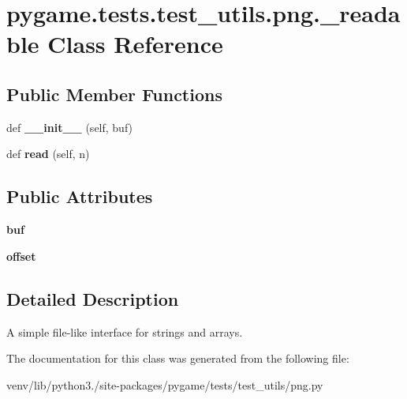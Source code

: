 \hypertarget{classpygame_1_1tests_1_1test__utils_1_1png_1_1__readable}{}\section{pygame.\+tests.\+test\+\_\+utils.\+png.\+\_\+readable Class Reference}
\label{classpygame_1_1tests_1_1test__utils_1_1png_1_1__readable}
\subsection*{Public Member Functions}
\begin{DoxyCompactItemize}
\item 
\mbox{\label{classpygame_1_1tests_1_1test__utils_1_1png_1_1__readable_a0be6bbcfc1be5d68fed54e150896993d}} 
def {\bfseries \+\_\+\+\_\+init\+\_\+\+\_\+} (self, buf)
\item 
\mbox{\label{classpygame_1_1tests_1_1test__utils_1_1png_1_1__readable_a27e49207af4d2a7040291765ced00a0b}} 
def {\bfseries read} (self, n)
\end{DoxyCompactItemize}
\subsection*{Public Attributes}
\begin{DoxyCompactItemize}
\item 
\mbox{\label{classpygame_1_1tests_1_1test__utils_1_1png_1_1__readable_a50971708571ee722c5d8ef92e1b48df9}} 
{\bfseries buf}
\item 
\mbox{\label{classpygame_1_1tests_1_1test__utils_1_1png_1_1__readable_a3429a182d8ee0a83468d2ae92d6bc972}} 
{\bfseries offset}
\end{DoxyCompactItemize}


\subsection{Detailed Description}
\begin{DoxyVerb}A simple file-like interface for strings and arrays.
\end{DoxyVerb}
 

The documentation for this class was generated from the following file\+:\begin{DoxyCompactItemize}
\item 
venv/lib/python3./site-\/packages/pygame/tests/test\+\_\+utils/png.\+py\end{DoxyCompactItemize}

